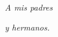 \thispagestyle{empty}

\bigskip

\begin{flushright}

\vspace*{7cm}

	\textit{A mis padres}
	
	\textit{y hermanos.}

\vspace*{\fill}

\end{flushright}

\newpage
\thispagestyle{empty}
\cleardoublepage